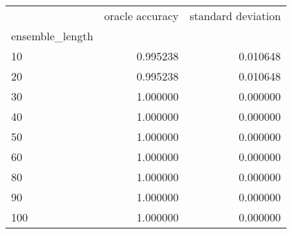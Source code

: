 \begin{tabular}{lrr}
\toprule
{} &  oracle accuracy &  standard deviation \\
ensemble\_length &                  &                     \\
\midrule
10              &         0.995238 &            0.010648 \\
20              &         0.995238 &            0.010648 \\
30              &         1.000000 &            0.000000 \\
40              &         1.000000 &            0.000000 \\
50              &         1.000000 &            0.000000 \\
60              &         1.000000 &            0.000000 \\
80              &         1.000000 &            0.000000 \\
90              &         1.000000 &            0.000000 \\
100             &         1.000000 &            0.000000 \\
\bottomrule
\end{tabular}
